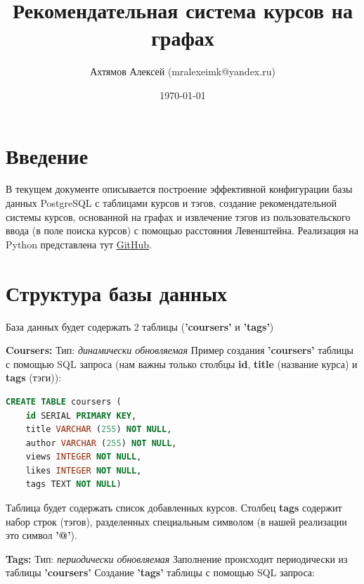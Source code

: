 \documentclass[12pt]{article}
\title{Рекомендательная система курсов на графах}
\author{Ахтямов Алексей (mralexeimk@yandex.ru)}
\date{\today}
\begin{document}
\maketitle

\section*{Введение}
В текущем документе описывается построение эффективной конфигурации базы данных PostgreSQL с таблицами курсов и тэгов, создание рекомендательной системы курсов, основанной на графах и извлечение тэгов из пользовательского ввода (в поле поиска курсов) с помощью расстояния Левенштейна. \newline
Реализация на Python представлена тут \href{https://github.com/Yedom/RecomendationSystem}{\color{blue}GitHub}.
\section*{Структура базы данных}
База данных будет содержать 2 таблицы (\textbf{'coursers'} и \textbf{'tags'}) \newline

\noindent \textbf{Coursers:} \newline
Тип: \textit{динамически обновляемая} \newline
Пример создания \textbf{'coursers'} таблицы с помощью SQL запроса (нам важны только столбцы \textbf{id}, \textbf{title} (название курса) и \textbf{tags} (тэги)): \newline

\begin{lstlisting}[language=sql]
CREATE TABLE coursers (
	id SERIAL PRIMARY KEY,
	title VARCHAR (255) NOT NULL,
	author VARCHAR (255) NOT NULL,
	views INTEGER NOT NULL,
	likes INTEGER NOT NULL,
	tags TEXT NOT NULL)
\end{lstlisting}

\noindent Таблица будет содержать список добавленных курсов. \newline
Столбец \textbf{tags} содержит набор строк (тэгов), разделенных специальным символом (в нашей реализации это символ \textbf{'@'}). \newline

\noindent \textbf{Tags:} \newline
Тип: \textit{периодически обновляемая} \newline
Заполнение происходит периодически из таблицы \textbf{'coursers'} \newline
Создание \textbf{'tags'} таблицы с помощью SQL запроса: \newline
\end{document}
